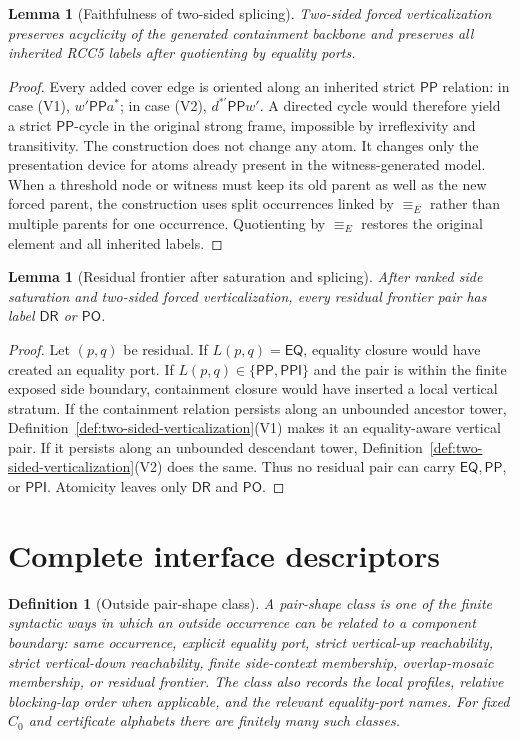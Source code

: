 \documentclass[11pt]{article}
\newtheorem{lemma}[theorem]{Lemma}
\newtheorem{definition}[theorem]{Definition}
\newcommand{\EQ}{\mathsf{EQ}}
\newcommand{\DR}{\mathsf{DR}}
\newcommand{\PO}{\mathsf{PO}}
\newcommand{\PP}{\mathsf{PP}}
\newcommand{\PPI}{\mathsf{PPI}}
\newcommand{\Eq}{\equiv_{\!E}}
\begin{document}
\begin{lemma}[Faithfulness of two-sided splicing]
\label{lem:splice-faithful}
Two-sided forced verticalization preserves acyclicity of the generated containment backbone and preserves all inherited RCC5 labels after quotienting by equality ports.
\end{lemma}

\begin{proof}
Every added cover edge is oriented along an inherited strict $\PP$ relation: in case (V1), $w'\PP a^*$; in case (V2), $d^{*'}\PP w'$.  A directed cycle would therefore yield a strict $\PP$-cycle in the original strong frame, impossible by irreflexivity and transitivity.  The construction does not change any atom.  It changes only the presentation device for atoms already present in the witness-generated model.  When a threshold node or witness must keep its old parent as well as the new forced parent, the construction uses split occurrences linked by $\Eq$ rather than multiple parents for one occurrence.  Quotienting by $\Eq$ restores the original element and all inherited labels.
\end{proof}

\begin{lemma}[Residual frontier after saturation and splicing]
\label{lem:residual-frontier}
After ranked side saturation and two-sided forced verticalization, every residual frontier pair has label $\DR$ or $\PO$.
\end{lemma}

\begin{proof}
Let $(p,q)$ be residual.  If $L(p,q)=\EQ$, equality closure would have created an equality port.  If $L(p,q)\in\{\PP,\PPI\}$ and the pair is within the finite exposed side boundary, containment closure would have inserted a local vertical stratum.  If the containment relation persists along an unbounded ancestor tower, Definition~\ref{def:two-sided-verticalization}(V1) makes it an equality-aware vertical pair.  If it persists along an unbounded descendant tower, Definition~\ref{def:two-sided-verticalization}(V2) does the same.  Thus no residual pair can carry $\EQ,\PP$, or $\PPI$.  Atomicity leaves only $\DR$ and $\PO$.
\end{proof}

\section{Complete interface descriptors}

\begin{definition}[Outside pair-shape class]
A pair-shape class is one of the finite syntactic ways in which an outside occurrence can be related to a component boundary: same occurrence, explicit equality port, strict vertical-up reachability, strict vertical-down reachability, finite side-context membership, overlap-mosaic membership, or residual frontier.  The class also records the local profiles, relative blocking-lap order when applicable, and the relevant equality-port names.  For fixed $C_0$ and certificate alphabets there are finitely many such classes.
\end{definition}
\end{document}
